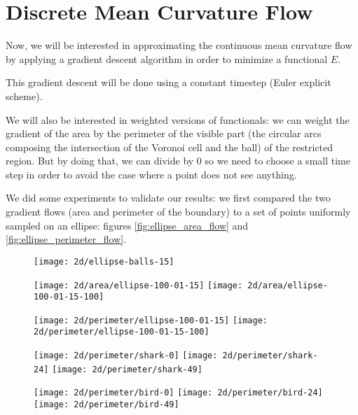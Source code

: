 \section{Discrete Mean Curvature Flow}

Now, we will be interested in approximating the continuous mean curvature flow
by applying a gradient descent algorithm in order to minimize a functional $ E
$.

This gradient descent will be done using a constant timestep (Euler explicit
scheme).

We will also be interested in weighted versions of functionals: we can weight
the gradient of the area by the perimeter of the visible part (the circular arcs
composing the intersection of the Voronoi cell and the ball) of the restricted
region. But by doing that, we can divide by $ 0 $ so we need to choose a small
time step in order to avoid the case where a point does not see anything.


We did some experiments to validate our results: we first compared the two
gradient flows (area and perimeter of the boundary) to a set of points uniformly
sampled on an ellipse: figures \ref{fig:ellipse_area_flow} and
\ref{fig:ellipse_perimeter_flow}.

\begin{figure}[h]
    \centering

    \texttt{[image: 2d/ellipse-balls-15]}

    \texttt{[image: 2d/area/ellipse-100-01-15]}
    \texttt{[image: 2d/area/ellipse-100-01-15-100]}
    \label{fig:ellipse_area_flow}

    \texttt{[image: 2d/perimeter/ellipse-100-01-15]}
    \texttt{[image: 2d/perimeter/ellipse-100-01-15-100]}
    \label{fig:ellipse_perimeter_flow}

    \texttt{[image: 2d/perimeter/shark-0]}
    \texttt{[image: 2d/perimeter/shark-24]}
    \texttt{[image: 2d/perimeter/shark-49]}

    \texttt{[image: 2d/perimeter/bird-0]}
    \texttt{[image: 2d/perimeter/bird-24]}
    \texttt{[image: 2d/perimeter/bird-49]}
    \label{fig:shark_perimeter_flow}
\end{figure}

